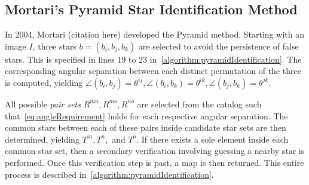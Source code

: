 \subsection{Mortari's Pyramid Star Identification Method}\label{subsec:mortari'sPyramidStarIdentificationMethod}
In 2004, Mortari (citation here) developed the Pyramid method.
Starting with an image $I$, three stars $b = (b_i, b_j, b_k)$ are selected to avoid the persistence of false stars.
This is specified in lines 19 to 23 in~\autoref{algorithm:pyramidIdentification}.
The corresponding angular separation between each distinct permutation of the three is computed, yielding $\angle
(b_i, b_j) = \theta^{ij}, \angle(b_i, b_k) = \theta^{ik}, \angle(b_j, b_k) = \theta^{jk}$.

All possible \textit{pair sets} $R^{mn}, R^{mo}, R^{no}$ are selected from the catalog such
that~\autoref{eq:angleRequirement} holds for each respective angular separation.
The common stars between each of these pairs inside candidate star sets are then determined, yielding $T^m, T^n, $ and
$T^o$.
If there exists a sole element inside each common star set, then a secondary verification involving guessing a nearby
star is performed.
Once this verification step is past, a map is then returned.
This entire process is described in~\autoref{algorithm:pyramidIdentification}.

